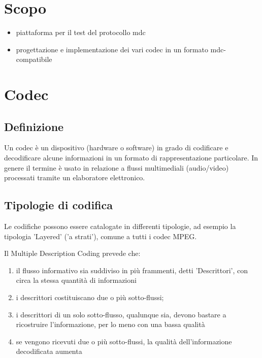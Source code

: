 

\chapter{Scopo}


\begin{itemize}
\item piattaforma per il test del protocollo mdc

\item progettazione e implementazione dei vari codec in un formato mdc-compatibile
\end{itemize}




\chapter{Codec}



\section{Definizione}


Un codec è un dispositivo (hardware o software) in grado di codificare e decodificare alcune informazioni in un formato di rappresentazione particolare. In genere il termine è usato in relazione a flussi multimediali (audio/video) processati tramite un elaboratore elettronico.






\section{Tipologie di codifica}


Le codifiche possono essere catalogate in differenti tipologie, ad esempio la tipologia 'Layered' ('a strati'), comune a tutti i codec MPEG.



Il Multiple Description Coding prevede che:
\begin{enumerate}
\item il flusso informativo sia suddiviso in più frammenti, detti 'Descrittori', con circa la stessa quantità di informazioni
\item i descrittori costituiscano due o più sotto-flussi;
\item i descrittori di un solo sotto-flusso, qualunque sia, devono bastare a ricostruire l'informazione, per lo meno con una bassa qualità
\item se vengono ricevuti due o più sotto-flussi, la qualità dell'informazione decodificata aumenta 
\end{enumerate}






